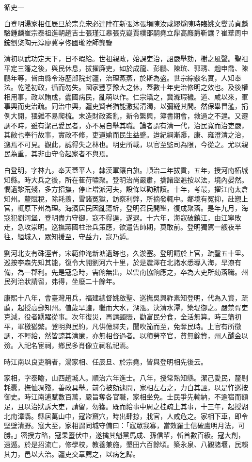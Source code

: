 
\begin{pinyinscope}
循吏一

白登明湯家相任辰旦於宗堯宋必達陸在新張沐張塤陳汝咸繆燧陳時臨姚文燮黃貞麟駱鍾麟崔宗泰祖進朝趙吉士張瑾江皋張克嶷賈樸邵嗣堯立鼎高廕爵靳讓？崔華周中鋐劉棨陶元淳廖冀亨佟國瓏陸師龔鑒

清初以武功定天下，日不暇給。世祖親政，始課吏治，詔嚴舉劾，樹之風聲。聖祖平定三籓之後，與民休息，拔擢廉吏，如於成龍、彭鵬、陳瑸、郭琇、趙申喬、陳鵬年等，皆由縣令洊歷部院封疆，治理蒸蒸，於斯為盛。世宗綜覈名實，人知奉法。乾隆初政，循而勿失。國家豐亨豫大之休，蓋數十年吏治修明之效也。及後權相用事，政以賄成，蠹國病民，亂萌以作。仁宗矯之，冀滌瑕穢。道、咸以來，軍事興而吏治疏。同治中興，疆吏賢者猶能激揚清濁，以彌縫其間。然保舉冒濫，捐例大開，猥雜不易爬梳。末造財政紊亂，新令繁興，簿書期會，救過之不遑。又遷調不時，雖有潔己愛民者，亦不易自舉其職。論者謂有清一代，治民寬而治吏嚴，其敝也奉行故事，實政不修，吏道媮而民生益蹙。迨紀綱漸隳，康、雍澄清之治，邈焉不可見。觀此，誠得失之林也。明史所載，以官至監司為限，今從之。尤以親民為重，其非由守令起家者不與焉。

白登明，字林九，奉天蓋平人，隸漢軍鑲白旗。順治二年拔貢，五年，授河南柘城知縣。時大兵之後，所在萑苻嘯聚。登明治尚嚴肅，擒諸盜魁按以法，境內晏然。憫遺黎荒殘，多方招撫，停止增派河夫，設條以勸耕讀。十年，考最，擢江南太倉知州。釐賦稅，除耗羨，雪諸冤獄，訪察利弊，所摘發輒中。鄰境有冤抑，赴愬上官，輒原下州為理。海濱居民因亂蕩析，登明召民開墾，復成聚落。是年九月，海寇犯劉河堡，登明盡力守御，寇不得逞，遂退。十六年，海寇破鎮江，由江寧敗走，急攻崇明。巡撫蔣國柱治兵策應，欲遣告師期，莫敢前。登明獨駕一艘夜半往，絙城入，眾知援至，守益力，寇乃遁。

劉河北支有硃涇者，宋範仲淹新塘遺跡也，久淤塞。登明請於上官，疏鑿五十里。巡按李森先知其能，復令大開劉河六十里，於是震澤在北諸水悉導入海，旱潦有備，為一郡利。先是寇急時，需餉無出，以雲南協餉應之，卒為大吏所劾落職。州民列治狀請留，弗得，坐廢二十餘年。

康熙十八年，會臺灣用兵，福建總督姚啟聖、巡撫吳興祚素知登明，代為入貲，疏薦，起授高郵知州。值歲旱蝗，繼而大水，湖漲。決清水潭，築堤御之。嚴禁胥吏克減，役者踴躍從事。次年復災，再請蠲賑，勸富民分食，全活無算。時三籓初平，軍檄猶繁。登明與民約，凡供億驛夫，聞吹笳而至，免奪民時。上官有所徵調，不輕給，然皆諒其清廉，亦無相督過者。以積勞卒官，貧無餘貲，州人醵金以殮。入祀名宦祠，鄉民多肖像立祠私祀焉。

時江南以良吏稱者，湯家相、任辰旦、於宗堯，皆與登明相先後云。

家相，字泰瞻，山西趙城人。順治六年進士。八年，授常熟知縣。潔己愛民，釐剔耗蠹，撫恤凋殘，善政具舉。前令被劾逮問，家相左右之，力白其誣，以是忤巡按御史。時江南逋賦數百萬，嚴旨奪各官職，家相坐免。士民爭先輸納，不逾宿而額足，且以治狀訴大吏，請留，勿獲。既而給事中周之桂疏上其事，十三年，起授湖北南漳縣。縣居萬山中，寇盜窟穴，時出肆掠，戕官，人咸危之。家相下車，即令堅壁清野。寇大至，家相謂同城守備曰：「寇眾我寡，當效羅士信破盧明月法，可勝。」密授方略，寇果墮伏中，遂擒其魁黨馬成、孫信輩，斬首數百級。寇大創，遠遁。於是招流亡，修學校，教養兼施，墾田六百餘頃。築永泉、八觀諸堰，民賴其力，邑以大治。疆吏交章薦之，以病乞歸。


\end{pinyinscope}
